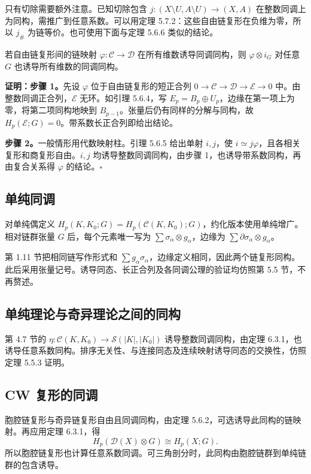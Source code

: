 只有切除需要额外注意。已知切除包含 $j:(X\setminus U,A\setminus U)\to(X,A)$ 在整数同调上为同构，需推广到任意系数。可以用定理 5.7.2：这些自由链复形在负维为零，所以 $j_\#$ 为链等价。也可使用下面与定理 5.6.6 类似的结论。

若自由链复形间的链映射 $\varphi:\mathcal C\to\mathcal D$ 在所有维数诱导同调同构，则 $\varphi\otimes i_G$ 对任意 $G$ 也诱导所有维数的同调同构。

\textbf{证明：步骤 1。}先设 $\varphi$ 位于自由链复形的短正合列 $0\to\mathcal C\to\mathcal D\to\mathcal E\to0$ 中。由整数同调正合列，$\mathcal E$ 无环。如引理 5.6.4，写 $E_p=B_p\oplus U_p$，边缘在第一项上为零，将第二项同构地映到 $B_{p-1}$。张量后仍有同样的分解与同构，故 $H_p(\mathcal E;G)=0$。带系数长正合列即给出结论。

\textbf{步骤 2。}一般情形用代数映射柱。引理 5.6.5 给出单射 $i,j$，使 $i\simeq j\varphi$，且各相关复形和商复形自由。$i,j$ 均诱导整数同调同构，由步骤 1，也诱导带系数同构，再由复合关系得 $\varphi$ 的结论。\hfill$\square$

\subsection*{单纯同调}
对单纯偶定义 $H_p(K,K_0;G)=H_p(\mathcal C(K,K_0);G)$，约化版本使用单纯增广。相对链群张量 $G$ 后，每个元素唯一写为 $\sum\sigma_\alpha\otimes g_\alpha$，边缘为 $\sum\partial\sigma_\alpha\otimes g_\alpha$。

第 1.11 节把相同链写作形式和 $\sum g_\alpha\sigma_\alpha$，边缘定义相同，因此两个链复形同构。此后采用张量记号。诱导同态、长正合列及各同调公理的验证均仿照第 5.5 节，不再赘述。

\subsection*{单纯理论与奇异理论之间的同构}
第 4.7 节的 $\eta:\mathcal C(K,K_0)\to\mathcal S(|K|,|K_0|)$ 诱导整数同调同构，由定理 6.3.1，也诱导任意系数同构。排序无关性、与连接同态及连续映射诱导同态的交换性，仿照定理 5.5.3 证明。

\subsection*{CW 复形的同调}
胞腔链复形与奇异链复形自由且同调同构，由定理 5.6.2，可选诱导此同构的链映射。再应用定理 6.3.1，得
\[
H_p(\mathcal D(X)\otimes G)\cong H_p(X;G).
\]
所以胞腔链复形也计算任意系数同调。可三角剖分时，此同构由胞腔链群到单纯链群的包含诱导。

